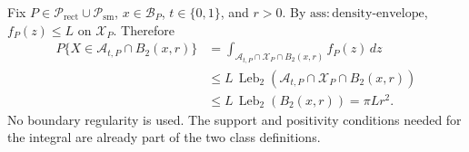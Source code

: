 Fix \(P\in\mathcal P_{\mathrm{rect}}\cup\mathcal P_{\mathrm{sm}}\), \(x\in\mathcal B_P\), \(t\in\{0,1\}\), and \(r>0\).  By \(\mathrm{ass:density\text{-}envelope}\), \(f_P(z)\leq L\) on \(\mathcal X_P\).  Therefore
\[
\begin{aligned}
 P\{X\in\mathcal A_{t,P}\cap B_2(x,r)\}
 &=\int_{\mathcal A_{t,P}\cap\mathcal X_P\cap B_2(x,r)}f_P(z)\,dz\\
 &\leq L\,\operatorname{Leb}_2\!\left(\mathcal A_{t,P}\cap\mathcal X_P\cap B_2(x,r)\right)\\
 &\leq L\,\operatorname{Leb}_2(B_2(x,r))
 =\pi Lr^2.
\end{aligned}
\]
No boundary regularity is used.  The support and positivity conditions needed for the integral are already part of the two class definitions.